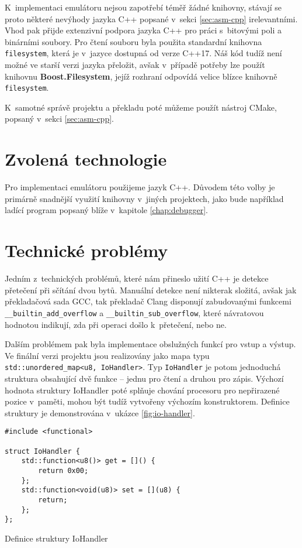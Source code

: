 K~implementaci emulátoru nejsou zapotřebí téměř žádné knihovny, stávají se proto některé nevýhody jazyka C++ popsané v~sekci \ref{sec:asm-cpp} irelevantními. Vhod pak přijde extenzivní podpora jazyka C++ pro práci s~bitovými poli a binárními soubory. Pro čtení souboru byla použita standardní knihovna \texttt{filesystem}, která je v~jazyce dostupná od verze C++17. Náš kód tudíž není možné ve starší verzi jazyka přeložit, avšak v~případě potřeby lze použít knihovnu \textbf{Boost.Filesystem}\cite{boost-filesystem}, jejíž rozhraní odpovídá velice blízce knihovně \texttt{filesystem}.

K~samotné správě projektu a překladu poté můžeme použít nástroj CMake, popsaný v~sekci \ref{sec:asm-cpp}.

\section{Zvolená technologie}

Pro implementaci emulátoru použijeme jazyk C++. Důvodem této volby je primárně snadnější využití knihovny v~jiných projektech, jako bude například ladící program popsaný blíže v~kapitole \ref{chap:debugger}.

\section{Technické problémy}

Jedním z~technických problémů, které nám přineslo užití C++ je detekce přetečení při sčítání dvou bytů. Manuální detekce není nikterak složitá, avšak jak překladačová sada GCC\cite{gcc-overflow}, tak překladač Clang\cite{clang-overflow} disponují zabudovanými funkcemi \texttt{\_\_builtin\_add\_overflow} a \texttt{\_\_builtin\_sub\_overflow}, které návratovou hodnotou indikují, zda při operaci došlo k~přetečení, nebo ne.

Dalším problémem pak byla implementace obslužných funkcí pro vstup a výstup. Ve finální verzi projektu jsou realizovány jako mapa typu \texttt{std::unordered_map<u8, IoHandler>}. Typ \texttt{IoHandler} je potom jednoduchá struktura obsahující dvě funkce -- jednu pro čtení a druhou pro zápis. Výchozí hodnota struktury IoHandler poté splňuje chování procesoru pro nepřirazené pozice v~paměti, mohou být tudíž vytvořeny výchozím konstruktorem. Definice struktury je demonstrována v~ukázce \ref{fig:io-handler}.

\begin{listing}
\begin{verbatim}
#include <functional>

struct IoHandler {
    std::function<u8()> get = []() {
        return 0x00;
    };
    std::function<void(u8)> set = [](u8) {
        return;
    };
};
\end{verbatim}
\caption{Definice struktury IoHandler}
\label{fig:io-handler}
\end{listing}

